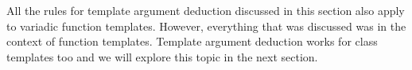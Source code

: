 All the rules for template argument deduction discussed in this section also apply to variadic function templates. However, everything that was discussed was in the context of function templates. Template argument deduction works for class templates too and we will explore this topic in the next section.














































